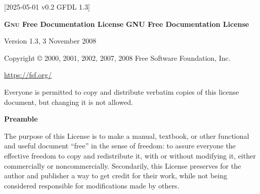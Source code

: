 [2025-05-01 v0.2 GFDL 1.3]
\makeatletter
\begin{center}
  \ifgfdl@sc
    \textbf{%
      \LARGE
      \textsc{Gnu} Free Documentation License%
    }%
  \else
    \textbf{%
      \LARGE
      GNU Free Documentation License%
    }%
  \fi

  \bigskip

  Version 1.3, 3 November 2008

  Copyright \copyright{} 2000, 2001, 2002, 2007, 2008 Free
  Software Foundation, Inc.

  \bigskip

  \url{https://fsf.org/}

  \bigskip

  Everyone is permitted to copy and distribute verbatim
  copies of this license document, but changing it is not
  allowed.

  \bigskip

  \textbf{\Large Preamble}
\end{center}

\noindent
The purpose of this License is to make a manual, textbook,
or other functional and useful document \enquote{free} in
the sense of freedom: to assure everyone the effective
freedom to copy and redistribute it, with or without
modifying it, either commercially or noncommercially.
Secondarily, this License preserves for the author and
publisher a way to get credit for their work, while not
being considered responsible for modifications made by
others.

